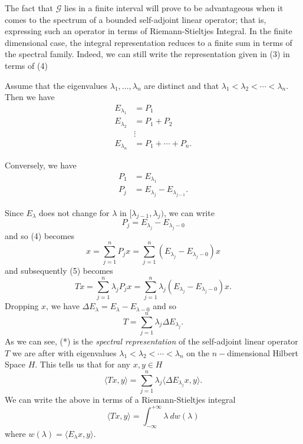 The fact that \( \mathcal{G} \) lies in a finite interval will prove to be advantageous when it comes to the spectrum of a bounded self-adjoint linear operator; that is, expressing such an operator in terms of Riemann-Stieltjes Integral. In the finite dimensional case, the integral representation reduces to a finite sum in terms of the spectral family. Indeed, we can still write the representation given in (3) in terms of (4)

Assume that the eigenvalues \( {\lambda}_{1}, \dots, {\lambda}_{n} \) are distinct and that \( {\lambda}_{1} < {\lambda}_{2} < \cdots < {\lambda}_{n} \). Then we have
\begin{align*}
    {E}_{{\lambda}_{1}} &= {P}_{1} \\
    {E}_{{\lambda}_{2}} &= {P}_{1} + {P}_{2} \\
                        &\vdots \\ 
    {E}_{{\lambda}_{n}} &= {P}_{1} + \cdots + {P}_{n}.
\end{align*}

Conversely, we have
\begin{align*}
    {P}_{1} &= {E}_{{\lambda}_{1}} \\
    {P}_{j} &= {E}_{{\lambda}_{j}} - {E}_{{\lambda}_{j-1}} \tag{\( 2 \leq j \leq n  \)}.
\end{align*}

Since \( {E}_{\lambda} \) does not change for \( \lambda  \) in \( [{\lambda}_{j-1}, {\lambda}_{j}) \), we can write
\[  {P}_{j} = {E}_{{\lambda}_{j}} - {E}_{{\lambda}_{j} - 0} \]
and so (4) becomes
\[  x = \sum_{ j=1  }^{ n } {P}_{j}x = \sum_{ j=1  }^{ n } ({E}_{{\lambda}_{j}} - {E}_{{\lambda}_{j} - 0}) x \]
and subsequently (5) becomes
\[  Tx = \sum_{ j=1  }^{ n } {\lambda}_{j} {P}_{j}x = \sum_{ j=1  }^{ n } {\lambda}_{j} ({E}_{{\lambda}_{j}} - {E}_{{\lambda}_{j} - 0})x. \]
Dropping \( x  \), we have
\( \Delta {E}_{\lambda} = {E}_{\lambda} - {E}_{\lambda - 0} \)
and so 
\[  T = \sum_{ j=1  }^{ n } {\lambda}_{j} \Delta {E}_{{\lambda}_{j}}. \tag{*} \]
As we can see, (*) is the \textit{spectral representation} of the self-adjoint linear operator \(  T  \) we are after with eigenvalues \( {\lambda}_{1} < {\lambda}_{2} < \cdots < {\lambda}_{n} \) on the \( n- \)dimensional Hilbert Space \( H  \).  This tells us that for any \( x,y \in H  \) 
\[  \langle Tx , y  \rangle = \sum_{ j=1  }^{ n } {\lambda}_{j} \langle \Delta {E}_{{\lambda}_{j}} x   , y  \rangle. \]
We can write the above in terms of a Riemann-Stieltjes integral 
\[  \langle Tx  , y  \rangle = \int_{ - \infty   }^{  + \infty  }  \lambda  \ d w(\lambda) \]
where \( w (\lambda) = \langle {E}_{\lambda} x  , y \rangle \).

